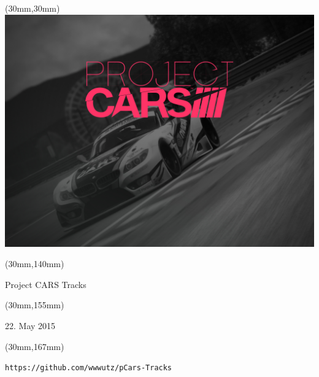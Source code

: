 \documentclass[oneside, a4paper, 12pt]{book}
\begin{document}
\selectfont
\textblockorigin{0cm}{0cm}

\newlength{\Logo}
\setlength{\Logo}{210mm-60mm}
\begin{textblock*}{\Logo}(30mm,30mm)%
\includegraphics[width=\Logo]{pcars-main.png}
\end{textblock*}

\begin{textblock*}{\Logo}(30mm,140mm)%
\begin{center}\Huge{Project CARS Tracks}\end{center}
\end{textblock*}

\begin{textblock*}{\Logo}(30mm,155mm)%
\begin{center}\large{22. May 2015}\end{center}
\end{textblock*}

\begin{textblock*}{\Logo}(30mm,167mm)%
\begin{center}\tt\large{https://github.com/wwwutz/pCars-Tracks}\end{center}
\end{textblock*}



\end{document}
